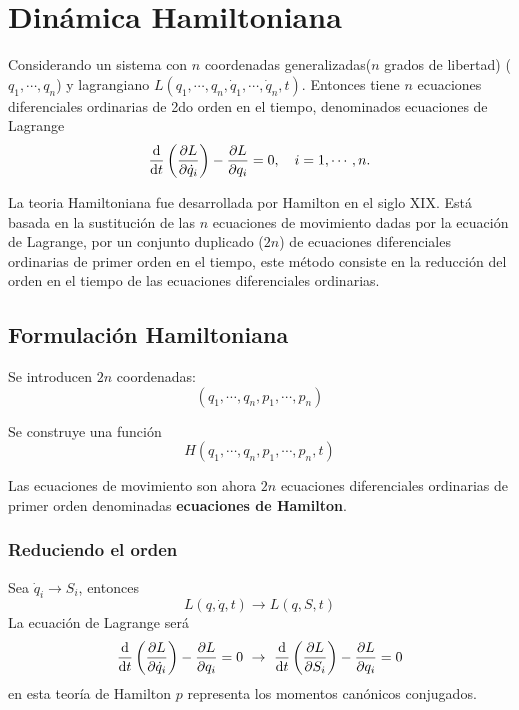 \documentclass[../main]{subfiles}
\begin{document}
    \section{Dinámica Hamiltoniana}
Considerando un sistema con $n$ coordenadas generalizadas($n$ grados de libertad) ($q_1, \cdots, q_n$) y lagrangiano $L(q_1, \cdots, q_n, \dot{q}_1, \cdots, \dot{q}_n, t)$. Entonces tiene $n$ ecuaciones diferenciales ordinarias de 2do orden en el tiempo, denominados ecuaciones de Lagrange 
\begin{equation}
    \dv{}{t}\left(\pdv{L}{\dot{q}_i}\right)-\pdv{L}{q_i}=0,\quad i=1, \cdots, n.
\end{equation}

La teoria Hamiltoniana fue desarrollada por Hamilton en el siglo XIX. Está basada en la sustitución de las $n$ ecuaciones de movimiento dadas por la ecuación de Lagrange, por un conjunto duplicado ($2n$) de ecuaciones diferenciales ordinarias de primer orden en el tiempo, este método consiste en la reducción del orden en el tiempo de las ecuaciones diferenciales ordinarias.

\subsection{Formulación Hamiltoniana}
Se introducen $2n$ coordenadas:
\begin{equation}
    (q_1, \cdots, q_n, p_1, \cdots, p_n)
\end{equation}

Se construye una función 
\begin{equation}
    H(q_1, \cdots, q_n, p_1, \cdots, p_n, t)
\end{equation}

Las ecuaciones de movimiento son ahora $2n$ ecuaciones diferenciales ordinarias de primer orden denominadas \textbf{ecuaciones de Hamilton}.

\subsubsection{Reduciendo el orden}
Sea $\dot{q}_i \rightarrow S_i$, entonces 
\begin{equation}
    L(q, \dot{q}, t) \rightarrow L(q, S, t)
\end{equation}
La ecuación de Lagrange será 
\begin{equation}
    \dv{}{t}\left(\pdv{L}{\dot{q}_i}\right)-\pdv{L}{q_i}=0 \ \rightarrow \ \dv{}{t}\left(\pdv{L}{S_i}\right)-\pdv{L}{q_i}=0
\end{equation}
en esta teoría de Hamilton $p$ representa los momentos canónicos conjugados.
\end{document}
